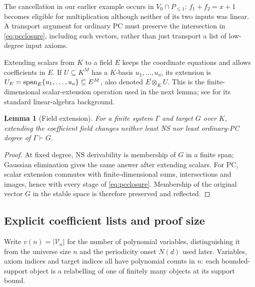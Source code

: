 \documentclass[11pt,a4paper]{article}
\newtheorem{lemma}[theorem]{Lemma}
\theoremstyle{definition}\newtheorem{definition}[theorem]{Definition}
\theoremstyle{remark}\newtheorem{remark}[theorem]{Remark}
\begin{document}
The cancellation in our earlier example occurs in
$V_0\cap P_{\le1}$: $f_1+f_2=x+1$ becomes eligible for multiplication
although neither of its two inputs was linear. A transport argument
for ordinary PC must preserve the intersection in \eqref{eq:pcclosure},
including such vectors, rather than just transport a list of low-degree
input axioms.

Extending scalars from $K$ to a field $E$ keeps the coordinate equations
and allows coefficients in $E$. If $U\subseteq K^M$ has a $K$-basis
$u_1,\ldots,u_a$, its extension is
$U_E=\operatorname{span}_E\{u_1,\ldots,u_a\}\subseteq E^M$, also denoted
$E\otimes_K U$. This is the finite-dimensional scalar-extension
operation used in the next lemma; see \cite{LangAlgebra} for its
standard linear-algebra background.

\begin{lemma}[Field extension]\label{lem:field}
For a finite system $\Gamma$ and target $G$ over $K$, extending the
coefficient field changes neither least NS nor least ordinary-PC
degree of $\Gamma\vdash G$.
\end{lemma}
\begin{proof}
At fixed degree, NS derivability is membership of $G$ in a finite span;
Gaussian elimination gives the same answer after extending scalars.
For PC, scalar extension commutes with finite-dimensional sums,
intersections and images, hence with every stage of
\eqref{eq:pcclosure}. Membership of the original vector $G$ in the
stable space is therefore preserved and reflected.
\end{proof}

\subsection{Explicit coefficient lists and proof size}\label{sec:dense-size}
Write $v(n)=|\mathcal V_n|$ for the number of polynomial variables,
distinguishing it from the universe size $n$ and the periodicity onset
$N(d)$ used later. Variables, axiom indices and target indices all have
polynomial counts in $n$: each bounded-support object is a relabelling
of one of finitely many objects at its support bound.
\end{document}
